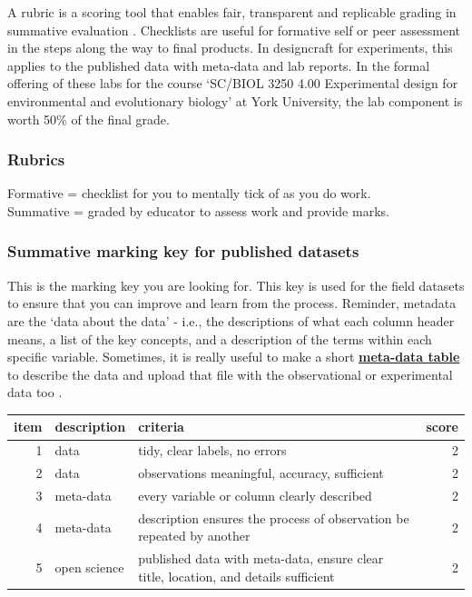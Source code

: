 \documentclass[
]{book}
\begin{document}
A rubric is a scoring tool that enables fair, transparent and replicable grading in summative evaluation \citep{RN6799}. Checklists are useful for formative self or peer assessment in the steps along the way to final products. In designcraft for experiments, this applies to the published data with meta-data and lab reports. In the formal offering of these labs for the course `SC/BIOL 3250 4.00 Experimental design for environmental and evolutionary biology' at York University, the lab component is worth 50\% of the final grade.

\hypertarget{rubrics-1}{%
\subsubsection*{Rubrics}\label{rubrics-1}}

Formative = checklist for you to mentally tick of as you do work.\\
Summative = graded by educator to assess work and provide marks.

\hypertarget{summative-marking-key-for-published-datasets}{%
\subsubsection*{Summative marking key for published datasets}\label{summative-marking-key-for-published-datasets}}

This is the marking key you are looking for. This key is used for the field datasets to ensure that you can improve and learn from the process. Reminder, metadata are the `data about the data' - i.e., the descriptions of what each column header means, a list of the key concepts, and a description of the terms within each specific variable. Sometimes, it is really useful to make a short \href{https://onlinelibrary.wiley.com/doi/full/10.1002/ece3.9245}{\textbf{meta-data table}} to describe the data and upload that file with the observational or experimental data too \citep{RNtables}.

\begin{tabular}{rllr}
\toprule
item & description & criteria & score\\
\midrule
1 & data & tidy, clear labels, no errors & 2\\
2 & data & observations meaningful, accuracy, sufficient & 2\\
3 & meta-data & every variable or column clearly described & 2\\
4 & meta-data & description ensures the process of observation be repeated by another & 2\\
5 & open science & published data with meta-data, ensure clear title, location, and details sufficient & 2\\
\bottomrule
\end{tabular}
\end{document}
